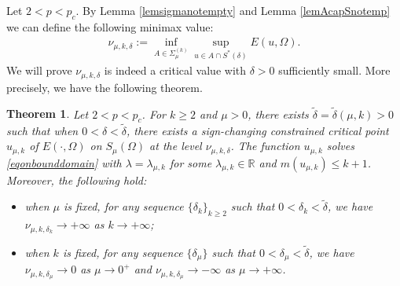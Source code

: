 \documentclass[10pt,a4paper]{article}
\newtheorem{theorem}{Theorem}[section]
\theoremstyle{definition} \theoremstyle{remark}
\numberwithin{equation}{section}
\newcommand{\R}{\mathbb{R}}
\newcommand{\la}{\lambda}
\begin{document}
Let $2 < p < p_c$. By Lemma \ref{lemsigmanotempty} and Lemma \ref{lemAcapSnotemp} we can define the following minimax value:
\begin{align} \label{eqdefofnu}
	\nu_{\mu,k,\delta} := \inf_{A \in \Sigma_{\mu}^{(k)}}\sup_{u \in A \cap S^*(\delta)}E(u,\Omega).
\end{align}
We will prove $\nu_{\mu,k,\delta}$ is indeed a critical value with $\delta > 0$ sufficiently small. More precisely, we have the following theorem.

\begin{theorem} \label{thmgenussub}
	Let $2 < p < p_c$. For $k \geq 2$ and $\mu > 0$, there exists $\tilde \delta = \tilde \delta(\mu,k) > 0$ such that when $0 < \delta < \tilde \delta$, there exists a sign-changing constrained critical point $u_{\mu,k}$ of $E(\cdot,\Omega)$ on $S_\mu(\Omega)$ at the level $\nu_{\mu,k,\delta}$. The function $u_{\mu,k}$ solves \eqref{eqonbounddomain} with $\la = \la_{\mu,k}$ for some $\la_{\mu,k} \in \R$ and $m(u_{\mu,k}) \le k+1$. Moreover, the following hold:
	\begin{itemize}
		\item when $\mu$ is fixed, for any sequence $\{\delta_k\}_{k \ge 2}$ such that $0 < \delta_k < \tilde \delta$, we have $\nu_{\mu,k,\delta_k} \to +\infty$ as $k \to +\infty$;
		\item when $k$ is fixed, for any sequence $\{\delta_\mu\}$ such that $0 < \delta_\mu < \tilde \delta$, we have $\nu_{\mu,k,\delta_\mu} \to 0$ as $\mu \to 0^+$ and $\nu_{\mu,k,\delta_\mu} \to -\infty$ as $\mu \to +\infty$.
	\end{itemize}
\end{theorem}
\end{document}
